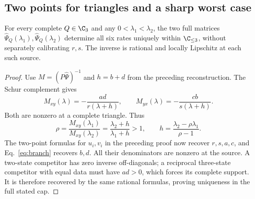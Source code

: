 \subsection{Two points for triangles and a sharp worst case}\label{subsec:two-laplace}

\begin{proposition}\label{prop:two-laplace}
For every complete $Q\in\C_3$ and any $0<\lambda_1<\lambda_2$, the two full
matrices $\widehat\Psi_Q(\lambda_1),\widehat\Psi_Q(\lambda_2)$ determine all
six rates uniquely within $\C_{\le3}$, without separately calibrating $r,s$.
The inverse is rational and locally Lipschitz at each such source.
\end{proposition}
\begin{proof}
Use $M=(P\widehat\Psi)^{-1}$ and $h=b+d$ from the preceding reconstruction.
The Schur complement gives
\begin{equation}
 M_{xy}(\lambda)=-\frac{ad}{r(\lambda+h)},\qquad
 M_{yx}(\lambda)=-\frac{cb}{s(\lambda+h)}.
 \label{eq:two-offdiagonal}
\end{equation}
Both are nonzero at a complete triangle. Thus
\begin{equation}
 \rho=\frac{M_{xy}(\lambda_1)}{M_{xy}(\lambda_2)}
 =\frac{\lambda_2+h}{\lambda_1+h}>1,
 \qquad h=\frac{\lambda_2-\rho\lambda_1}{\rho-1}.
 \label{eq:two-hidden-escape}
\end{equation}
The two-point formulas for $u_i,v_i$ in the preceding proof now recover
$r,s,a,c$, and Eq.~\eqref{eq:branch} recovers $b,d$. All their denominators
are nonzero at the source. A two-state competitor has zero inverse
off-diagonals; a reciprocal three-state competitor with equal data must
have $ad>0$, which forces its complete support. It is therefore recovered
by the same rational formulas, proving uniqueness in the full stated cap.
\end{proof}


